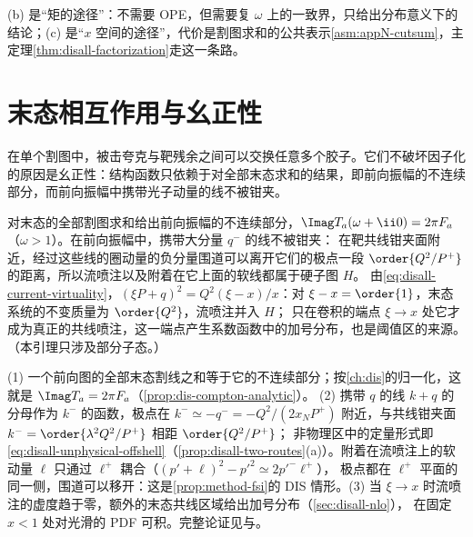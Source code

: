 \noindent
(b) 是“矩的途径”：不需要 OPE，但需要复 $\omega$ 上的一致界，只给出分布意义下的结论；(c) 是“$x$ 空间的途径”，代价是割图求和的公共表示\cref{asm:appN-cutsum}，主定理\cref{thm:disall-factorization}走这一条路。

\section{末态相互作用与幺正性}\label{sec:disall-fsi}

在单个割图中，被击夸克与靶残余之间可以交换任意多个胶子。它们不破坏因子化的原因是幺正性：结构函数只依赖于对全部末态求和的结果，即前向振幅的不连续部分，而前向振幅中携带光子动量的线不被钳夹。

\begin{lemma}\label{lem:disall-fsi}
对末态的全部割图求和给出前向振幅的不连续部分，$\Imag T_a(\omega+\ii0)=2\pi F_a$（$\omega>1$）。在前向振幅中，携带大分量 $q^-$ 的线不被钳夹：
在靶共线钳夹面附近，经过这些线的圈动量的负分量围道可以离开它们的极点一段 $\order{Q^2/P^+}$ 的距离，所以流喷注以及附着在它上面的软线都属于硬子图 $H$。
由\cref{eq:disall-current-virtuality}，$(\xi P+q)^2=Q^2(\xi-x)/x$：对 $\xi-x=\order{1}$，末态系统的不变质量为 $\order{Q^2}$，流喷注并入 $H$；
只在卷积的端点 $\xi\to x$ 处它才成为真正的共线喷注，这一端点产生系数函数中的加号分布，也是阈值区的来源。（本引理只涉及部分子态。）
\end{lemma}

\begin{proofsketch}
(1) 一个前向图的全部末态割线之和等于它的不连续部分；按\cref{ch:dis}的归一化，这就是 $\Imag T_a=2\pi F_a$（\cref{prop:dis-compton-analytic}）。
(2) 携带 $q$ 的线 $k+q$ 的分母作为 $k^-$ 的函数，极点在 $k^-\simeq-q^-=-Q^2/(2x_NP^+)$ 附近，与共线钳夹面 $k^-=\order{\lambda^2Q^2/P^+}$ 相距 $\order{Q^2/P^+}$；
非物理区中的定量形式即\cref{eq:disall-unphysical-offshell}（\cref{prop:disall-two-routes}(a)）。附着在流喷注上的软动量 $\ell$ 只通过 $\ell^+$ 耦合（$(p'+\ell)^2-p'^2\simeq2p'^-\ell^+$），
极点都在 $\ell^+$ 平面的同一侧，围道可以移开：这是\cref{prop:method-fsi}的 DIS 情形。(3) 当 $\xi\to x$ 时流喷注的虚度趋于零，额外的末态共线区域给出加号分布（\cref{sec:disall-nlo}），
在固定 $x<1$ 处对光滑的 PDF 可积。完整论证见\cite[第~8.7~节]{CollinsSoperSterman1989}与\cite{LibbySterman1978a}。
\end{proofsketch}

